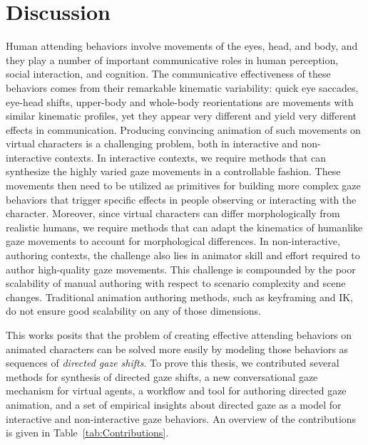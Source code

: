 \pagestyle{deposit}

\chapter{Discussion}
\label{cha:Discussion}

Human attending behaviors involve movements of the eyes, head, and body, and they play a number of important communicative roles in human perception, social interaction, and cognition. The communicative effectiveness of these behaviors comes from their remarkable kinematic variability: quick eye saccades, eye-head shifts, upper-body and whole-body reorientations are movements with similar kinematic profiles, yet they appear very different and yield very different effects in communication. Producing convincing animation of such movements on virtual characters is a challenging problem, both in interactive and non-interactive contexts.
In interactive contexts, we require methods that can synthesize the highly varied gaze movements in a controllable fashion. These movements then need to be utilized as primitives for building more complex gaze behaviors that trigger specific effects in people observing or interacting with the character.
Moreover, since virtual characters can differ morphologically from realistic humans, we require methods that can adapt the kinematics of humanlike gaze movements to account for morphological differences.
In non-interactive, authoring contexts, the challenge also lies in animator skill and effort required to author high-quality gaze movements. This challenge is compounded by the poor scalability of manual authoring with respect to scenario complexity and scene changes. Traditional animation authoring methods, such as keyframing and IK, do not ensure good scalability on any of those dimensions.

This works posits that the problem of creating effective attending behaviors on animated characters can be solved more easily by modeling those behaviors as sequences of \emph{directed gaze shifts}. To prove this thesis, we contributed several methods for synthesis of directed gaze shifts, a new conversational gaze mechanism for virtual agents, a workflow and tool for authoring directed gaze animation, and a set of empirical insights about directed gaze as a model for interactive and non-interactive gaze behaviors. An overview of the contributions is given in Table~\ref{tab:Contributions}.

